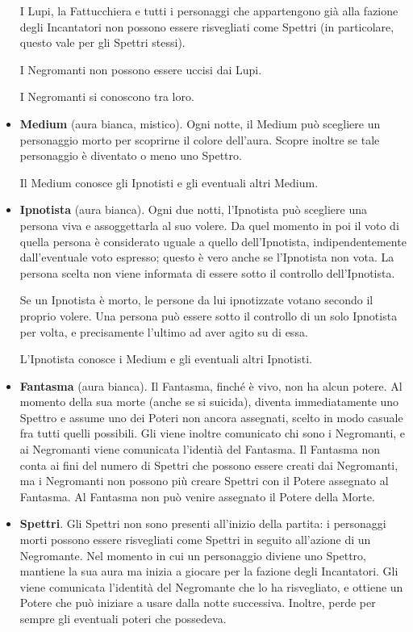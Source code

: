 \documentclass[a4paper,10pt]{article}
\begin{document}
\begin{itemize}
 I Lupi, la Fattucchiera e tutti i personaggi che appartengono già alla fazione degli Incantatori non possono essere risvegliati come Spettri (in particolare, questo vale per gli Spettri stessi).%
 
 
 I Negromanti non possono essere uccisi dai Lupi.

 I Negromanti si conoscono tra loro.
 
 \item {\bf Medium} (aura bianca, mistico). Ogni notte, il Medium può scegliere un personaggio morto per scoprirne il colore dell'aura. Scopre inoltre se tale personaggio è diventato o meno uno Spettro.

 Il Medium conosce gli Ipnotisti e gli eventuali altri Medium.

 \item {\bf Ipnotista} (aura bianca). Ogni due notti, l'Ipnotista può scegliere una persona viva e assoggettarla al suo volere. Da quel momento in poi il voto di quella persona è considerato uguale a quello dell'Ipnotista, indipendentemente dall'eventuale voto espresso; questo è vero anche se l'Ipnotista non vota.
 La persona scelta non viene informata di essere sotto il controllo dell'Ipnotista.

 Se un Ipnotista è morto, le persone da lui ipnotizzate votano secondo il proprio volere.
 Una persona può essere sotto il controllo di un solo Ipnotista per volta, e precisamente l'ultimo ad aver agito su di essa.

 L'Ipnotista conosce i Medium e gli eventuali altri Ipnotisti.

 \item {\bf Fantasma} (aura bianca). Il Fantasma, finché è vivo, non ha alcun potere. Al momento della sua morte (anche se si suicida), diventa immediatamente uno Spettro e assume uno dei Poteri non ancora assegnati, scelto in modo casuale fra tutti quelli possibili. Gli viene inoltre comunicato chi sono i Negromanti, e ai Negromanti viene comunicata l'identià del Fantasma. Il Fantasma non conta ai fini del numero di Spettri che possono essere creati dai Negromanti, ma i Negromanti non possono più creare Spettri con il Potere assegnato al Fantasma.
 Al Fantasma non può venire assegnato il Potere della Morte.
 
 \item {\bf Spettri}. Gli Spettri non sono presenti all'inizio della partita: i personaggi morti possono essere risvegliati come Spettri in seguito all'azione di un Negromante.
 Nel momento in cui un personaggio diviene uno Spettro, mantiene la sua aura ma inizia a giocare per la fazione degli Incantatori. Gli viene comunicata l'identità del Negromante che lo ha risvegliato, e ottiene un Potere che può iniziare a usare dalla notte successiva. Inoltre, perde per sempre gli eventuali poteri che possedeva.
 

\end{itemize}
\end{document}
